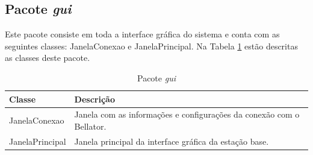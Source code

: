 \subsection{Pacote \textit{gui}}

Este pacote consiste em toda a interface gráfica do sistema e conta com as seguintes classes: JanelaConexao e JanelaPrincipal. Na Tabela \ref{tab:pacote_interface_grafica} estão descritas as classes deste pacote.

\begin{table}[h]
  \centering
  \caption{Pacote \textit{gui}}
    \begin{tabular}{p{6cm}p{8cm}}
    \toprule
    \textbf{Classe} & \textbf{Descrição} \\ 
    \midrule
    JanelaConexao & Janela com as informações e configurações da conexão com o Bellator. \\ \hline
    JanelaPrincipal & Janela principal da interface gráfica da estação base. \\ 
    \bottomrule
    \end{tabular}%
  \label{tab:pacote_interface_grafica}%
\end{table}%

%
%
%
%

